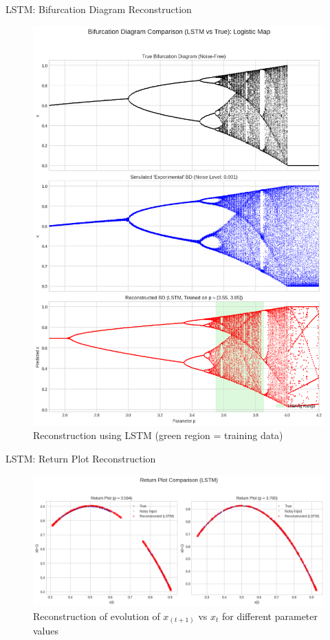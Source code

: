 \documentclass{beamer}
\begin{document}
\begin{frame}{LSTM: Bifurcation Diagram Reconstruction}
\begin{figure}
\centering
\includegraphics[width=1.0\linewidth]{figures/lstm_bd_1.png}
\caption{Reconstruction using LSTM (green region = training data)}
\end{figure}
\end{frame}

\begin{frame}{LSTM: Return Plot Reconstruction}
\begin{figure}
\centering
\includegraphics[width=1\linewidth]{figures/lstm_bd_2.png}
\caption{Reconstruction of evolution of $x_{(t+1)}$ vs $x_t$ for different parameter values}
\end{figure}
\end{frame}
\end{document}
